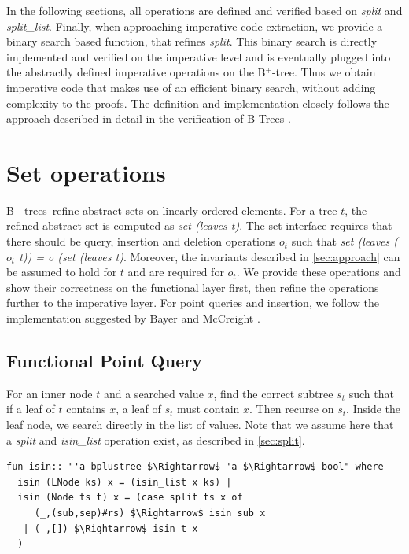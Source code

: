 \documentclass[a4paper,UKenglish,cleveref, autoref, thm-restate]{lipics-v2021}
\newcommand{\btree}{B$^+$-tree}
\newcommand{\btrees}{B$^+$-trees}
\begin{document}
In the following sections, all operations are defined and verified
based on \emph{split} and \emph{split\_list}.
Finally, when approaching imperative code extraction,
we provide a binary search based function, that refines \emph{split}.
This binary search is directly implemented and verified on the imperative
level and is eventually plugged into the abstractly defined
imperative operations on the \btree.
Thus we obtain imperative code that makes use of an efficient
binary search, without adding complexity to the proofs.
The definition and implementation closely follows
the approach described in detail in the
verification of B-Trees \cite{DBLP:journals/afp/Mundler21}.


\section{Set operations}
\label{sec:set}

\btrees\ refine abstract sets on linearly ordered elements.
For a tree $t$, the refined abstract set is computed as \emph{set (leaves t)}.
The set interface requires that there should be query, insertion and deletion
operations $o_t$ such that \emph{set (leaves ($o_t$ t)) = o (set (leaves t)}.
Moreover, the invariants described in \autoref{sec:approach}
can be assumed to hold for $t$ and are required for $o_t$.
We provide these operations and show their correctness on the functional
layer first, then refine the operations further to the imperative
layer.
For point queries and insertion, we follow the implementation
suggested by Bayer and McCreight \cite{DBLP:journals/acta/BayerM72}.

\subsection{Functional Point Query}
\label{sec:functional_pq}

For an inner node $t$ and a searched value $x$, find the correct subtree $s_t$
such that if a leaf of $t$ contains $x$, a leaf of $s_t$ must contain $x$.
Then recurse on $s_t$.
Inside the leaf node, we search directly in the list of values.
Note that we assume here that a \textit{split} and \textit{isin\_list} operation exist,
as described in \autoref{sec:split}.

\begin{lstlisting}[mathescape=true, language=Isabelle,label=lst:isin-def]
fun isin:: "'a bplustree $\Rightarrow$ 'a $\Rightarrow$ bool" where
  isin (LNode ks) x = (isin_list x ks) |
  isin (Node ts t) x = (case split ts x of
     (_,(sub,sep)#rs) $\Rightarrow$ isin sub x
   | (_,[]) $\Rightarrow$ isin t x
  )
\end{lstlisting}
\end{document}

